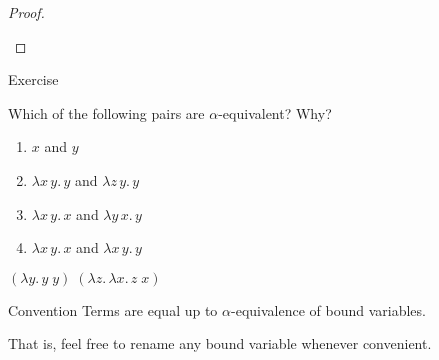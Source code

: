 \begin{frame}

  \begin{proof}
  \begin{prooftree}
  \end{prooftree}
  \end{proof}
  
\end{frame}
\begin{frame}{Exercise}

Which of the following pairs are $\alpha$-equivalent? Why?
\begin{enumerate}
  \item $x$ and $y$
  \item $\lambda x\,y.\, y$ and $\lambda z\,y.\, y$
  \item $\lambda x\,y.\, x$ and $\lambda y\,x.\, y$
  \item $\lambda x\,y.\, x$ and $\lambda x\,y.\, y$
\end{enumerate}
  
  $(\lambda y.\,y\;y)\;(\lambda z.\,\lambda x.\, z\;x)$
\begin{block}{Convention}
  Terms are equal up to $\alpha$-equivalence of bound variables. 
\end{block}

That is, feel free to rename any bound variable whenever convenient.
  
\end{frame}
%
%

